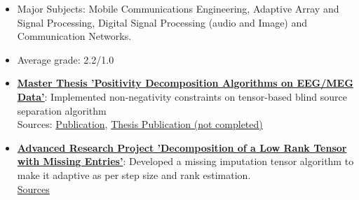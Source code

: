 \vspace{-1em}
\begin{itemize}[leftmargin=*]
  \item Major Subjects: Mobile Communications Engineering, Adaptive Array and Signal Processing, Digital Signal Processing (audio and Image) and Communication Networks.
  \item Average grade: 2.2/1.0

\vspace{0.2em}

  \item \underline{\textbf{Master Thesis 'Positivity Decomposition Algorithms on EEG/MEG Data'}}: Implemented non-negativity constraints on tensor-based blind source separation algorithm 
  \\ {\fontsize{10pt}{10pt}\selectfont\textcolor{blocktext2_color}{Sources: {\fontsize{10pt}{10pt}\selectfont\textcolor{blocktext2_color}{\href{https://ieeexplore.ieee.org/document/8313193}{Publication}}, {\fontsize{10pt}{10pt}\selectfont\textcolor{blocktext2_color}{\href{https://amr-aboughazala.super.site/non-negative-semi-algebraic-cp-decomposition-via-simultaneous-matrix-diagonalization}{Thesis Publication (not completed)}}}}}}

\vspace{0.2em}  

  \item \underline{\textbf{Advanced Research Project 'Decomposition of a Low Rank Tensor with Missing Entries'}}: Developed a missing imputation tensor algorithm to make it adaptive as per step size and rank estimation.
  \\ {\fontsize{10pt}{10pt}\selectfont\textcolor{blocktext2_color}{\href{https://amr-aboughazala.super.site/decomposition-of-a-low-rank-tensor-with-missing-entries}{Sources}}}       
\end{itemize}                          

\newpage                                 
                                 
